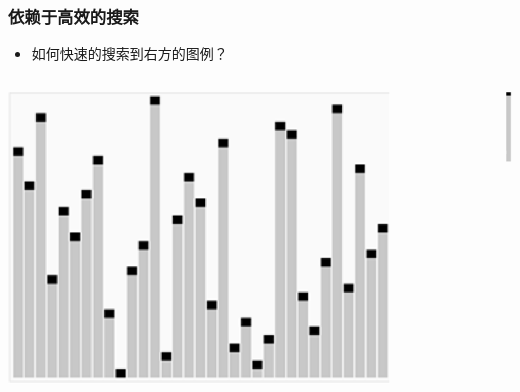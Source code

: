 \begin{frame}[fragile]
  \frametitle{依赖于高效的搜索}

  \begin{itemize}
  \item 如何快速的搜索到右方的图例？
  \end{itemize}

    \begin{columns}
    \begin{column}[T]{.6\linewidth}
      \includegraphics[width=0.8\textwidth]{figs/intro/sort_demo_1.png}
    \end{column}
    \begin{column}[T]{.5\linewidth}
      \vspace{2cm}
      \includegraphics[width=0.2cm]{figs/intro/sort_demo_2.png}
    \end{column}
  \end{columns}

\end{frame}

